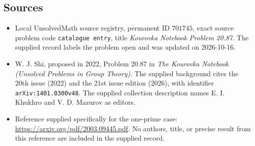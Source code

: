 \documentclass[11pt]{article}
\begin{document}
\subsection{Sources}
\begin{itemize}
\item Local UnsolvedMath source registry, permanent ID \(701745\), exact source problem code \texttt{catalogue entry}, title \emph{Kourovka Notebook Problem 20.87}. The supplied record labels the problem open and was updated on 2026-10-16.
\item W. J. Shi, proposed in 2022, Problem 20.87 in \emph{The Kourovka Notebook (Unsolved Problems in Group Theory)}. The supplied background cites the 20th issue (2022) and the 21st issue edition (2026), with identifier \texttt{arXiv:1401.0300v48}. The supplied collection description names E. I. Khukhro and V. D. Mazurov as editors.
\item Reference supplied specifically for the one-prime case: \url{https://arxiv.org/pdf/2003.09445.pdf}. No authors, title, or precise result from this reference are included in the supplied record.
\end{itemize}
\end{document}
